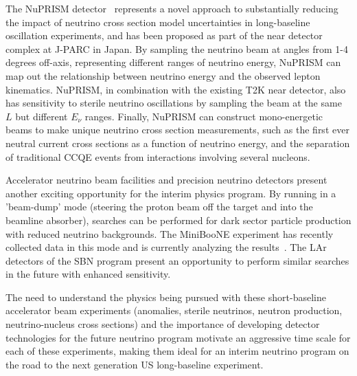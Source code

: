 The NuPRISM detector~\cite{Bhadra:2014oma} represents a novel approach
to substantially reducing the impact of neutrino cross section model
uncertainties in long-baseline oscillation experiments, and has been
proposed as part of the near detector complex at J-PARC in Japan. By
sampling the neutrino beam at angles from 1-4 degrees off-axis,
representing different ranges of neutrino energy, NuPRISM can map out
the relationship between neutrino energy and the observed lepton
kinematics. NuPRISM, in combination with the existing T2K near
detector, also has sensitivity to sterile neutrino oscillations by
sampling the beam at the same $L$ but different $E_{\nu}$
ranges. Finally, NuPRISM can construct mono-energetic beams to make
unique neutrino cross section measurements, such as the first ever
neutral current cross sections as a function of neutrino energy, and
the separation of traditional CCQE events from interactions involving
several nucleons.

Accelerator neutrino beam facilities and precision neutrino detectors
present another exciting opportunity for the interim physics program.
By running in a 'beam-dump' mode (steering the proton beam off the
target and into the beamline absorber), searches can be performed for
dark sector particle production with reduced neutrino backgrounds.
The MiniBooNE experiment has recently collected data in this mode and
is currently analyzing the
results~\cite{Dharmapalan:2012xp,Thornton:2014ufa}.  The LAr detectors
of the SBN program present an opportunity to perform similar searches
in the future with enhanced sensitivity.

The need to understand the physics being pursued with these
short-baseline accelerator beam experiments (anomalies, sterile
neutrinos, neutron production, neutrino-nucleus cross sections) and
the importance of developing detector technologies for the future
neutrino program motivate an aggressive time scale for each of these
experiments, making them ideal for an interim neutrino program on the
road to the next generation US long-baseline experiment.
